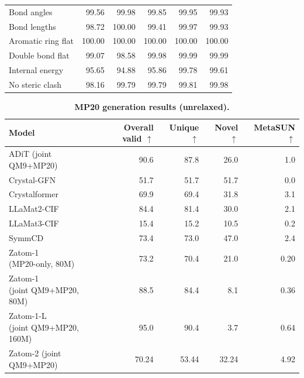 \documentclass{article} %
\begin{document}
\begin{table}[htbp]
\begin{minipage}[t]{0.54\linewidth}
\begin{tabular}{@{}lrrrrr@{}}
    Bond angles & 99.56 & 99.98 & 99.85 & 99.95 & 99.93 \\
    Bond lengths & 98.72 & 100.00 & 99.41 & 99.97 & 99.93 \\
    Aromatic ring flat & 100.00 & 100.00 & 100.00 & 100.00 & 100.00 \\
    Double bond flat & 99.07 & 98.58 & 99.98 & 99.99 & 99.99 \\
    Internal energy & 95.65 & 94.88 & 95.86 & 99.78 & 99.61 \\
    No steric clash & 98.16 & 99.79 & 99.79 & 99.81 & 99.98 \\
    \bottomrule
  \end{tabular}
  \par\vspace{0.2em}
  \raggedright
  \end{minipage}
\end{table}
\FloatBarrier

\begin{table}[htbp]
  \centering
  \scriptsize
  \caption{\textbf{MP20 generation results (unrelaxed).}}
  \label{tab:geom-drugs-mp20-benchmark-full}
  \vspace{0.4em}

  \begin{tabular}{@{}lrrrr@{}}
    \toprule
    Model & \shortstack{Overall valid\\$\uparrow$} &
    \shortstack{Unique\\$\uparrow$} & \shortstack{Novel\\$\uparrow$} &
    \shortstack{MetaSUN\\$\uparrow$} \\
    \midrule
    ADiT (joint QM9+MP20) & 90.6 & 87.8 & 26.0 & 1.0 \\
    Crystal-GFN & 51.7 & 51.7 & 51.7 & 0.0 \\
    Crystalformer & 69.9 & 69.4 & 31.8 & 3.1 \\
    LLaMat2-CIF & 84.4 & 81.4 & 30.0 & 2.1 \\
    LLaMat3-CIF & 15.4 & 15.2 & 10.5 & 0.2 \\
    SymmCD & 73.4 & 73.0 & 47.0 & 2.4 \\
    \shortstack[l]{Zatom-1\\(MP20-only, 80M)} & 73.2 & 70.4 & 21.0 & 0.20 \\
    \shortstack[l]{Zatom-1\\(joint QM9+MP20, 80M)} & 88.5 & 84.4 & 8.1 & 0.36 \\
    \shortstack[l]{Zatom-1-L\\(joint QM9+MP20, 160M)} & 95.0 & 90.4 & 3.7 & 0.64 \\
    \midrule
    Zatom-2 (joint QM9+MP20) & 70.24 & 53.44 & 32.24 & 4.92 \\
    \bottomrule
  \end{tabular}
\end{table}
\FloatBarrier
\end{document}
